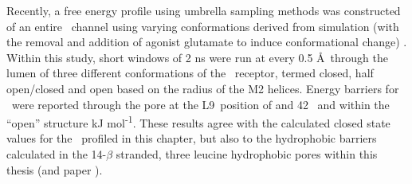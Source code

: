 Recently, a free energy profile using umbrella sampling methods was constructed of an entire \gl\ channel using varying conformations derived from simulation (with the removal and addition of agonist glutamate to induce conformational change) \cite{Yoluk2015}. Within this study, short windows of 2 ns were run at every 0.5 \AA\ through the lumen of three different conformations of the \gl\ receptor, termed closed, half open/closed and open based on the radius of the M2 helices. Energy barriers for \Cl\ were reported through the pore at the L9\textquotesingle\ position of  and  42 \kj\  and within the ``open'' structure  kJ mol\textsuperscript{-1}. These results agree with the calculated closed state values for the \HT\ profiled in this chapter, but also to the hydrophobic barriers calculated in the 14-$\beta$ stranded, three leucine hydrophobic pores within this thesis (and paper \cite{Trick2014}). 



